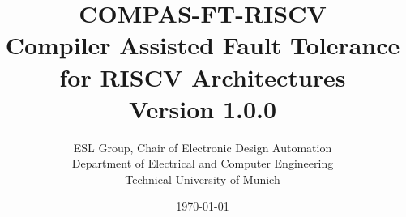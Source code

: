 \documentclass[12pt]{report}
\date{\today}
\title{
COMPAS-FT-RISCV \\
\large Compiler Assisted Fault Tolerance for RISCV Architectures \\
\small Version 1.0.0
}
\author{
ESL Group, Chair of Electronic Design Automation \\
Department of Electrical and Computer Engineering \\
Technical University of Munich
}
\begin{document}
\maketitle

\tableofcontents
\listoffigures

\newpage
\printacronyms



\end{document}
